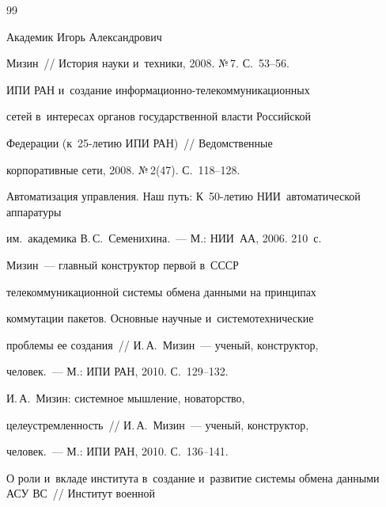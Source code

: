 {\small\frenchspacing


{%




\begin{thebibliography}{99}







 Академик Игорь Александрович


Мизин~/\!\!/ История науки и~техники, 2008. №\,7. С.~53--56.




 ИПИ РАН и~создание ин\-фор\-ма\-ци\-он\-но-те\-ле\-ком\-му\-ни\-ка\-ци\-он\-ных


сетей в~интересах органов государственной власти Российской


Федерации (к~25-ле\-тию ИПИ РАН)~/\!\!/ Ведомственные


корпоративные сети, 2008. №\,2(47). С.~118--128.




Автоматизация управления. Наш путь: К~50-ле\-тию НИИ~автоматической аппаратуры


им.~академика В.\,С.~Семенихина.~--- М.: НИИ~АА, 2006. 210~с.




 Мизин~--- главный конструктор первой в~СССР


телекоммуникационной системы обмена данными на принципах


коммутации пакетов. Основные научные и~системотехнические


проблемы ее создания~/\!\!/ И.\,А.~Мизин~--- ученый, конструктор,


человек.~--- М.: ИПИ РАН, 2010. С.~129--132.




 И.\,А.~Мизин: системное мышление, новаторство,


целеустремленность~/\!\!/ И.\,А.~Мизин~--- ученый, конструктор,


человек.~--- М.: ИПИ РАН, 2010. С.~136--141.







 О роли и~вкладе института в~создание и~развитие системы обмена данными АСУ ВС~/\!\!/ Институт военной



\end{thebibliography}}}
